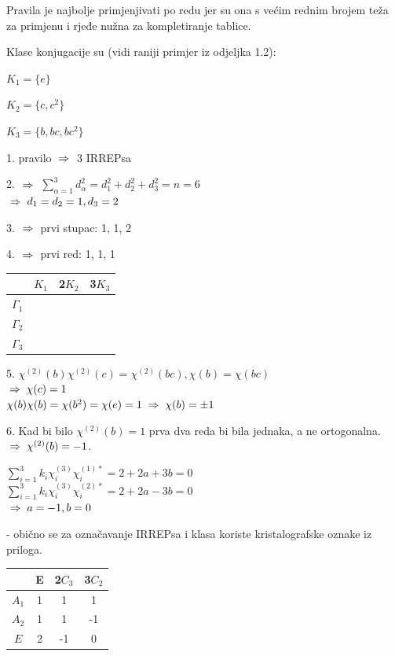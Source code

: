 Pravila je najbolje primjenjivati po redu jer su ona s većim rednim
brojem teža za primjenu i rjeđe nužna za kompletiranje tablice.


\begin{primjer}[$D_3$]

Klase konjugacije su (vidi raniji primjer iz odjeljka 1.2):

$K_1=\{e\}$

$K_2 = \{c, c^2\}$

$K_3 = \{ b, bc, bc^2 \}$

1. pravilo $\;\Rightarrow\;$ 3 IRREPsa

2. $\;\Rightarrow\;$ $\sum_{\alpha=1}^{3} d_{\alpha}^2 = d_{1}^2 + d_{2}^2
   + d_{3}^2 = n = 6 $ \\
     $\;\Rightarrow\; d_1 = d_2 =1, d_3=2 $

3. $\;\Rightarrow\;$ prvi stupac: 1, 1, 2

4. $\;\Rightarrow\;$ prvi red: 1, 1, 1

\begin{tabular}{c|ccc}
  & $K_1$ & 2$K_2$  & 3$K_3$ \\ \hline
$\Gamma_1$ &   &  &   \\
$\Gamma_2$ &   &  &   \\
 $\Gamma_3$  &   &  &  
\end{tabular}

5. $\chi^{(2)}(b)\chi^{(2)}(c)=\chi^{(2)}(bc), \chi(b)=\chi(bc)$ \\
  $\;\Rightarrow\; \chi(c)=1$ \\
  $\chi(b)\chi(b)=\chi(b^2)=\chi(e)=1 \;\Rightarrow\; \chi(b)=\pm 1 $

6. Kad bi bilo $\chi^{(2)}(b)=1$ prva dva reda bi bila jednaka, a ne
   ortogonalna. $\;\Rightarrow\; \chi^{(2)}(b)=-1$.

   $\sum_{i=1}^{3} k_{i} \chi^{(3)}_{i} \chi^{(1) *}_{i} =
      2+2a+3b=0$ \\
   $\sum_{i=1}^{3} k_{i} \chi^{(3)}_{i} \chi^{(2) *}_{i} =
      2+2a-3b=0$ \\
   $\;\Rightarrow\; a=-1, b=0$

- obično se za označavanje IRREPsa i klasa koriste kristalografske
   oznake iz priloga.
 

\begin{tabular}{c|ccc}
  & E & 2$C_3$  & 3$C_2$ \\ \hline
$A_1$ & 1 & 1& 1 \\
$A_2$ & 1 & 1&-1 \\
 $E$  & 2 &-1& 0
\end{tabular}

\end{primjer}

